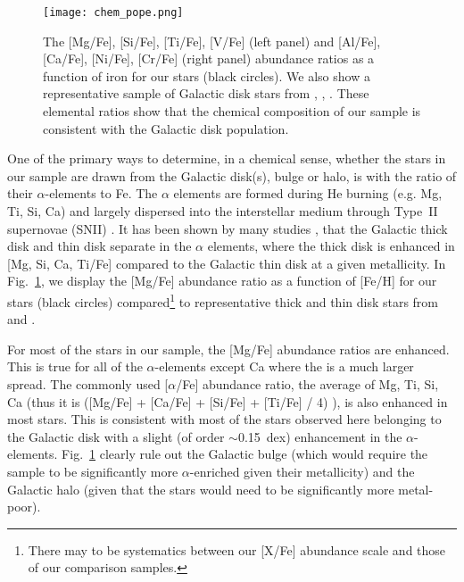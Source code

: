 \documentclass[a4paper,fleqn,usenatbib]{mnras}
\begin{document}
%

\begin{figure}
\noindent\texttt{[image: chem\_pope.png]}

\caption{\label{alphael}
The [Mg/Fe], [Si/Fe], [Ti/Fe], [V/Fe] (left panel) and [Al/Fe], [Ca/Fe], [Ni/Fe], [Cr/Fe] (right panel) abundance ratios as a function of iron for our stars (black circles). We also show a representative sample of Galactic disk stars from \citet[open red square,][]{Bensby2014}, \citet[open orange squares,][]{Adibekyan2012}, \citet[light green circles][]{Battistini2015}. These elemental ratios show that the chemical composition of our sample is consistent with the Galactic disk population. } %
\end{figure}
One of the primary ways to determine, in a chemical sense, whether the stars in our sample are drawn from the Galactic disk(s), bulge or halo, is with the ratio of their $\alpha$-elements to Fe. The $\alpha$ elements are formed during He burning (e.g. Mg, Ti, Si, Ca) and largely dispersed into the interstellar medium through Type~II supernovae (SNII) \citep{Matteucci2001}. It has been shown by many studies \citep[e.g.][and references therein]{Edvardsson1993, Adibekyan2012, Feltzing2013, Bensby2014}, that the Galactic thick disk and thin disk separate in the $\alpha$ elements, where the thick disk is enhanced in [Mg, Si, Ca, Ti/Fe] compared to the Galactic thin disk at a given metallicity. In Fig.~\ref{alphael}, we display the [Mg/Fe] abundance ratio as a function of [Fe/H] for our stars (black circles) compared\footnote{There may to be systematics between our [X/Fe] abundance scale and those of our comparison samples.} to representative thick and thin disk stars from \cite[open red square]{Bensby2014} and \cite[open orange triangles]{Adibekyan2012}. 

For most of the stars in our sample, the [Mg/Fe] abundance ratios are enhanced. This is true for all of the $\alpha$-elements except Ca where the is a much larger spread. The commonly used [$\alpha$/Fe] abundance ratio, the average of Mg, Ti, Si, Ca (thus it is ([Mg/Fe] + [Ca/Fe] + [Si/Fe] + [Ti/Fe] / 4) ), is also enhanced in most stars. This is consistent with most of the stars observed here belonging to the Galactic disk with a slight (of order $\sim$0.15~dex) enhancement in the $\alpha$-elements. Fig.~\ref{alphael} clearly rule out the Galactic bulge (which would require the sample to be significantly more $\alpha$-enriched given their metallicity) and the Galactic halo (given that the stars would need to be significantly more metal-poor). %
\end{document}
